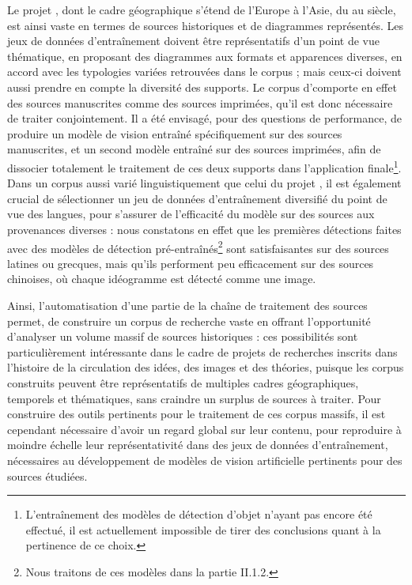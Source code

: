 Le projet \eida, dont le cadre géographique s'étend de l'Europe à l'Asie, du \viii au \xviii siècle, est ainsi vaste en termes de sources historiques et de diagrammes représentés. Les jeux de données d'entraînement doivent être représentatifs d'un point de vue thématique, en proposant des diagrammes aux formats et apparences diverses, en accord avec les typologies variées retrouvées dans le corpus ; mais ceux-ci doivent aussi prendre en compte la diversité des supports. Le corpus d'\eida comporte en effet des sources manuscrites comme des sources imprimées, qu'il est donc nécessaire de traiter conjointement. Il a été envisagé, pour des questions de performance, de produire un modèle de vision entraîné spécifiquement sur des sources manuscrites, et un second modèle entraîné sur des sources imprimées, afin de dissocier totalement le traitement de ces deux supports dans l'application finale\footnote{L'entraînement des modèles de détection d'objet n'ayant pas encore été effectué, il est actuellement impossible de tirer des conclusions quant à la pertinence de ce choix.}. Dans un corpus aussi varié linguistiquement que celui du projet \eida, il est également crucial de sélectionner un jeu de données d'entraînement diversifié du point de vue des langues, pour s'assurer de l'efficacité du modèle sur des sources aux provenances diverses : nous constatons en effet que les premières détections faites avec des modèles de détection pré-entraînés\footnote{Nous traitons de ces modèles dans la partie II.1.2.} sont satisfaisantes sur des sources latines ou grecques, mais qu'ils performent peu efficacement sur des sources chinoises, où chaque idéogramme est détecté comme une image.

Ainsi, l'automatisation d'une partie de la chaîne de traitement des sources permet, de construire un corpus de recherche vaste en offrant l'opportunité d'analyser un volume massif de sources historiques : ces possibilités sont particulièrement intéressante dans le cadre de projets de recherches inscrits dans l'histoire de la circulation des idées, des images et des théories, puisque les corpus construits peuvent être représentatifs de multiples cadres géographiques, temporels et thématiques, sans craindre un surplus de sources à traiter. Pour construire des outils pertinents pour le traitement de ces corpus massifs, il est cependant nécessaire d'avoir un regard global sur leur contenu, pour reproduire à moindre échelle leur représentativité dans des jeux de données d'entraînement, nécessaires au développement de modèles de vision artificielle pertinents pour des sources étudiées.
    
